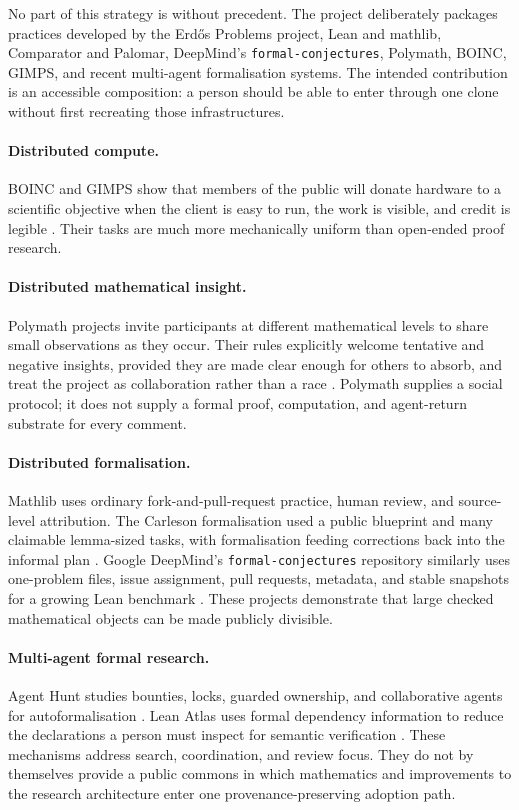 \documentclass[10pt]{article}
\begin{document}
No part of this strategy is without precedent.  The project deliberately
packages practices developed by the Erd\H{o}s Problems project, Lean and
mathlib, Comparator and Palomar, DeepMind's \texttt{formal-conjectures},
Polymath, BOINC, GIMPS, and recent multi-agent formalisation systems.  The
intended contribution is an accessible composition: a person should be able
to enter through one clone without first recreating those infrastructures.

\paragraph{Distributed compute.}
BOINC and GIMPS show that members of the public will donate hardware to a
scientific objective when the client is easy to run, the work is visible, and
credit is legible \cite{boinc,gimps}.  Their tasks are much more mechanically
uniform than open-ended proof research.

\paragraph{Distributed mathematical insight.}
Polymath projects invite participants at different mathematical levels to
share small observations as they occur.  Their rules explicitly welcome
tentative and negative insights, provided they are made clear enough for
others to absorb, and treat the project as collaboration rather than a race
\cite{polymath}.  Polymath supplies a social protocol; it does not supply a
formal proof, computation, and agent-return substrate for every comment.

\paragraph{Distributed formalisation.}
Mathlib uses ordinary fork-and-pull-request practice, human review, and
source-level attribution.  The Carleson formalisation used a public blueprint
and many claimable lemma-sized tasks, with formalisation feeding corrections
back into the informal plan \cite{mathlib,carleson}.  Google DeepMind's
\texttt{formal-conjectures} repository similarly uses one-problem files,
issue assignment, pull requests, metadata, and stable snapshots for a growing
Lean benchmark \cite{formalconjectures}.  These projects demonstrate that
large checked mathematical objects can be made publicly divisible.

\paragraph{Multi-agent formal research.}
Agent Hunt studies bounties, locks, guarded ownership, and collaborative
agents for autoformalisation \cite{agenthunt}.  Lean Atlas uses formal
dependency information to reduce the declarations a person must inspect for
semantic verification \cite{leanatlas}.  These mechanisms address search,
coordination, and review focus.  They do not by themselves provide a public
commons in which mathematics and improvements to the research architecture
enter one provenance-preserving adoption path.
\end{document}
